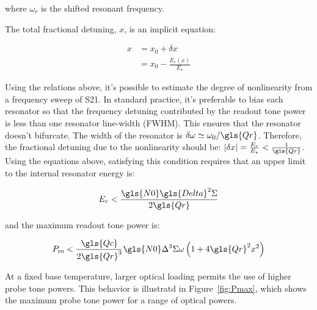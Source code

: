 where $\omega_{r}$ is the shifted resonant frequency.

The total fractional detuning, $x$, is an implicit equation:

\begin{equation} \label{eq:implicit detuning}
  \begin{aligned}
  x &= x_{0} + \delta x \\
    &= x_{0} -\frac{E_{r}(x)}{E_{\star}}
    \end{aligned}
\end{equation}

Using the relations above, it's possible to estimate the degree of nonlinearity from a frequency sweep of  \gls{S21}. In standard practice, it's preferable to bias each resonator so that the frequency detuning contributed by the readout tone power is less than one resonator line-width (FWHM). This ensures that the resonator doesn't bifurcate. The width of the resonator is $\delta \omega \simeq \omega_{0}/\gls{Qr}$. Therefore, the fractional detuning due to the nonlinearity should be: $\left| \delta x \right| = \frac{E_{r}}{E_{\star}} < \frac{1}{\gls{Qr}}$. Using the equations above, satisfying this condition requires that an upper limit to the internal resonator energy is:

\begin{equation}
  E_{r} < \frac{\gls{N0}\gls{Delta}^{2}\Sigma}{2\gls{Qr}}
\end{equation}

and the maximum readout tone power is:

\begin{equation} \label{eq:Pmax}
  P_{\mathrm{ro}} < \frac{\gls{Qc}}{2\gls{Qr}^{3}}\gls{N0}\Delta^{3}\Sigma\omega\left(1 + 4\gls{Qr}^{2}x^{2} \right)
\end{equation}

At a fixed base temperature, larger optical loading permits the use of higher probe tone powers. This behavior is illustratd in Figure~\ref{fig:Pmax}, which shows the maximum probe tone power for a range of optical powers.

